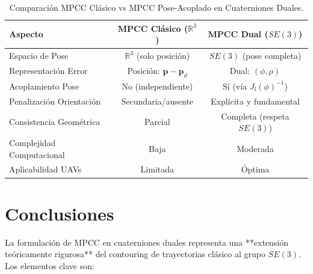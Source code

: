\documentclass[11pt,a4paper]{article}
\begin{document}
\begin{table}[h]
\centering
\begin{tabular}{|l|c|c|}
\hline
\textbf{Aspecto} & \textbf{MPCC Clásico ($\mathbb{R}^3$)} & \textbf{MPCC Dual ($SE(3)$)} \\
\hline
Espacio de Pose & $\mathbb{R}^3$ (solo posición) & $SE(3)$ (pose completa) \\
\hline
Representación Error & Posición: $\mathbf{p} - \mathbf{p}_d$ & Dual: $(\phi, \rho)$ \\
\hline
Acoplamiento Pose & No (independiente) & Sí (vía $J_l(\phi)^{-1}$) \\
\hline
Penalización Orientación & Secundaria/ausente & Explícita y fundamental \\
\hline
Consistencia Geométrica & Parcial & Completa (respeta $SE(3)$) \\
\hline
Complejidad Computacional & Baja & Moderada \\
\hline
Aplicabilidad UAVs & Limitada & Óptima \\
\hline
\end{tabular}
\caption{Comparación MPCC Clásico vs MPCC Pose-Acoplado en Cuaterniones Duales.}
\end{table}

\section{Conclusiones}
\label{sec:conclusions}

La formulación de MPCC en cuaterniones duales representa una **extensión teóricamente rigurosa** del contouring de trayectorias clásico al grupo $SE(3)$. Los elementos clave son:
\end{document}
